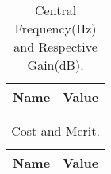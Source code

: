 \begin{table}[ht]
  \centering
  \begin{tabular}{|l|r|}
    \hline    
    {\bf Name} & {\bf Value} \\ \hline
    
  \end{tabular}
  \caption{Central Frequency(Hz) and Respective Gain(dB).}
\end{table}


\begin{table}[ht]
  \centering
  \begin{tabular}{|l|r|}
    \hline    
    {\bf Name} & {\bf Value} \\ \hline
    
  \end{tabular}
  \caption{Cost and Merit.}
\end{table}











